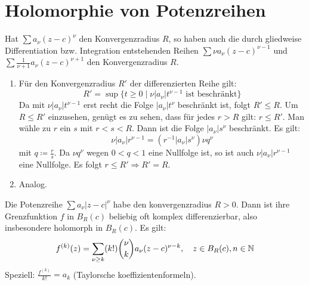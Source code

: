 \section{Holomorphie von Potenzreihen}
\begin{satz}
	Hat $ \sum a_\nu(z-c)^\nu $ den Konvergenzradius $ R $, so haben auch die durch gliedweise Differentiation bzw. Integration entstehenden Reihen $ \sum \nu a_\nu(z-c)^{\nu-1} $ und $ \sum\frac{1}{\nu+1}a_\nu(z-c)^{\nu+1} $ den Konvergenzradius $ R $.
\end{satz}
\begin{beweis}
	\begin{enumerate}
		\item F\"ur den Konvergenzradius $ R' $ der differenzierten Reihe gilt:
		\[ R'=\sup\lbrace t\geq 0\mid \nu|a_\nu|t^{\nu-1}\text{ ist beschr\"ankt}\rbrace \]
		Da mit $ \nu|a_\nu|t^{\nu-1} $ erst recht die Folge $ |a_\nu|t^\nu $ beschr\"ankt ist, folgt $ R'\leq R $. Um $ R\leq R' $ einzusehen, gen\"ugt es zu sehen, dass f\"ur jedes $ r>R $ gilt: $ r\leq R' $. Man w\"ahle zu $ r $ ein $ s $ mit $ r<s<R $. Dann ist die Folge $ |a_\nu|s^\nu $ beschr\"ankt. Es gilt:
		\[ \nu|a_\nu|r^{\nu-1}=(r^{-1}|a_\nu|s^\nu)\nu q^\nu \]
		mit $ q\coloneqq \frac{r}{s} $. Da $ \nu q^\nu $ wegen $ 0<q<1 $ eine Nullfolge ist, so ist auch $ \nu|a_\nu|r^{\nu-1} $ eine Nullfolge. Es folgt $ r\leq R'\Rightarrow R'=R $.
		\item Analog.
	\end{enumerate}
\end{beweis}
\begin{satz}
	Die Potenzreihe $ \sum a_\nu|z-c|^\nu $ habe den konvergenzradius $ R>0 $. Dann ist ihre Grenzfunktion $ f $ in $ B_R(c) $ beliebig oft komplex differenzierbar, also insbesondere holomorph in $ B_R(c) $. Es gilt:
	\[ f^{(k)}(z)=\sum_{\nu\geq k} (k!)\binom{\nu}{k}a_\nu(z-c)^{\nu-k},\quad z\in B_R(c), n\in\mathbb{N} \]
	Speziell: $ \frac{f^{(k)}}{k!}=a_k $ (Taylorsche koeffizientenformeln).
\end{satz}
